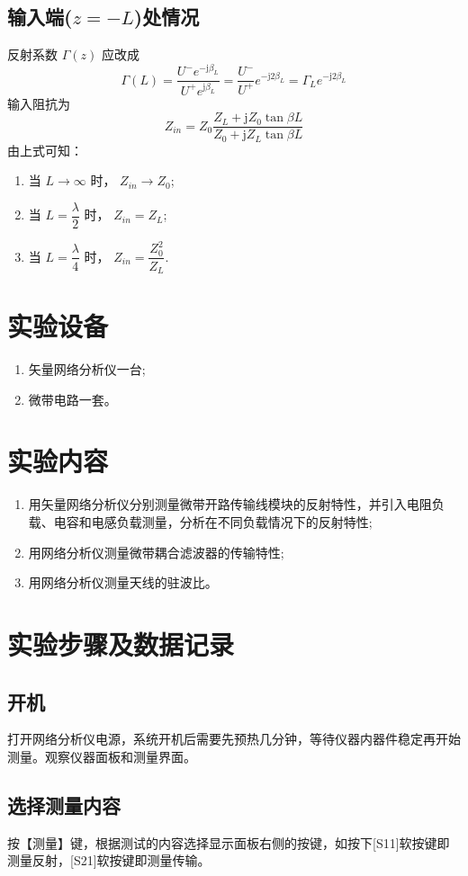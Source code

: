 \documentclass{source/Report}
\begin{document}
\subsection{输入端($z=-L$)处情况}
反射系数 $\Gamma(z)$ 应改成
$$\Gamma(L)=\dfrac{U^-e^{-\text{j}\beta_L}}{U^+e^{\text{j}\beta_L}}=\dfrac{U^-}{U^+}e^{-\text{j}2\beta_L}=\Gamma_Le^{-\text{j}2\beta_L}$$
输入阻抗为
$$Z_{in}=Z_0\dfrac{Z_L+\text{j}Z_0\tan{\beta L}}{Z_0+\text{j}Z_L\tan{\beta L}}$$
由上式可知：
\begin{enumerate}
    \item 当 $L\to \infty$ 时， $Z_{in}\to Z_0$;
    \item 当 $\displaystyle L=\dfrac{\lambda}{2}$ 时， $Z_{in}=Z_L$;
    \item 当 $\displaystyle L=\dfrac{\lambda}{4}$ 时， $Z_{in}=\dfrac{Z_0^2}{Z_L}$.
\end{enumerate}
\section{实验设备}
\begin{enumerate}[label={\arabic*.}]
    \item 矢量网络分析仪\qquad 一台;
    \item 微带电路\qquad 一套。
\end{enumerate}
\section{实验内容}
\begin{enumerate}[label={\arabic*.}]
    \item 用矢量网络分析仪分别测量微带开路传输线模块的反射特性，并引入电阻负载、电容和电感负载测量，分析在不同负载情况下的反射特性;
    \item 用网络分析仪测量微带耦合滤波器的传输特性;
    \item 用网络分析仪测量天线的驻波比。
\end{enumerate}
\section{实验步骤及数据记录}
\subsection{开机}
打开网络分析仪电源，系统开机后需要先预热几分钟，等待仪器内器件稳定再开始测量。观察仪器面板和测量界面。
\subsection{选择测量内容}
按【测量】键，根据测试的内容选择显示面板右侧的按键，如按下[S11]软按键即测量反射，[S21]软按键即测量传输。
\end{document}
